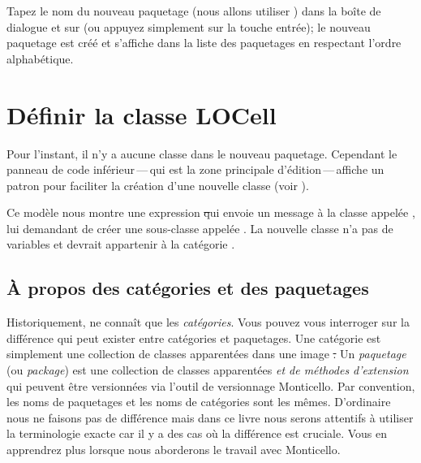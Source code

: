 \documentclass[a4paper,10pt,twoside]{book}
\begin{document}
Tapez le nom du nouveau paquetage (nous allons utiliser
) dans la boîte de dialogue et \clickz{} sur
 (ou appuyez simplement sur la touche entrée); le nouveau
paquetage est créé et s'affiche dans la liste des paquetages en
respectant l'ordre alphabétique.

\section{Définir la classe LOCell}

Pour l'instant, il n'y a aucune classe dans le nouveau paquetage. Cependant le
panneau de code inférieur\,---\,qui est la zone principale
d'édition\,---\,affiche un patron pour faciliter la création d'une
nouvelle classe (voir ).

Ce modèle nous montre une expression \st qui envoie un message à la
classe appelée , lui demandant de créer une sous-classe
appelée .  La nouvelle classe n'a pas de variables
et devrait appartenir à la catégorie .

\subsection{À propos des catégories et des paquetages}

Historiquement, \st{} ne connaît que les \emph{catégories}. Vous
pouvez vous interroger sur la différence qui peut exister entre
catégories et paquetages.
Une catégorie est simplement une collection de classes apparentées
dans une image \st. Un \emph{paquetage} (ou \emph{package})
est une collection de classes apparentées \emph{et de méthodes
  d'extension} qui peuvent être versionnées via l'outil de versionnage
Monticello.
Par convention, les noms de paquetages et les noms de catégories sont
les mêmes.
D'ordinaire nous ne faisons pas de différence mais dans ce
livre nous serons attentifs à utiliser la terminologie exacte car il
y a des cas où la différence est cruciale.
Vous en apprendrez plus lorsque nous aborderons le travail avec
Monticello.

\end{document}
